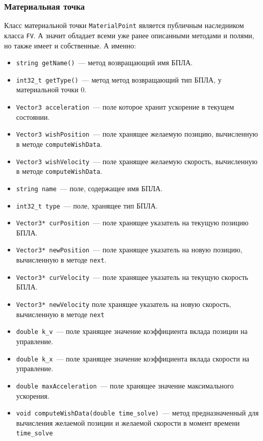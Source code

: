 \documentclass[a4paper,12pt]{article}
\numberwithin{figure}{subsubsection}
\begin{document}
\subsubsection{Материальная точка}
Класс материальной точки \texttt{MaterialPoint} является публичным наследником класса \texttt{FV}. А значит обладает всеми уже ранее описанными методами и полями, но также имеет и собственные. А именно:
\begin{itemize}
    \item \texttt{string getName()}~--- метод возвращающий имя БПЛА.
    \item \texttt{int32\_t getType()}~--- метод метод возвращающий тип БПЛА, у материальной точки 0.
    
    \item \texttt{Vector3 acceleration}~--- поле которое хранит ускорение в текущем состоянии.
    \item \texttt{Vector3 wishPosition}~--- поле хранящее желаемую позицию, вычисленную в методе \texttt{computeWishData}.
    \item \texttt{Vector3 wishVelocity}~--- поле хранящее желаемую скорость, вычисленную в методе \texttt{computeWishData}.
    \item \texttt{string name}~--- поле, содержащее имя БПЛА.
    \item \texttt{int32\_t type}~--- поле, хранящее тип БПЛА.

    \item\texttt{Vector3* curPosition}~--- поле хранящее указатель на текущую позицию БПЛА.
    \item\texttt{Vector3* newPosition}~--- поле хранящее указатель на новую позицию, вычисленную в методе \texttt{next}.
    \item\texttt{Vector3* curVelocity}~--- поле хранящее указатель на текущую скорость БПЛА.
    \item\texttt{Vector3* newVelocity} поле хранящее указатель на новую скорость, вычисленную в методе \texttt{next}
    \item\texttt{double k\_v}~--- поле хранящее значение коэффициента вклада позиции на управление.
    \item\texttt{double k\_x}~--- поле хранящее значение коэффициента вклада скорости на управление.
    \item\texttt{double maxAcceleration}~--- поле хранящее значение максимального ускорения.\textbf{}
    
    \item\texttt{void computeWishData(double time\_solve)}~--- метод предназначенный для вычисления желаемой позиции и желаемой скорости в момент времени \texttt{time\_solve}
\end{itemize}
\end{document}
